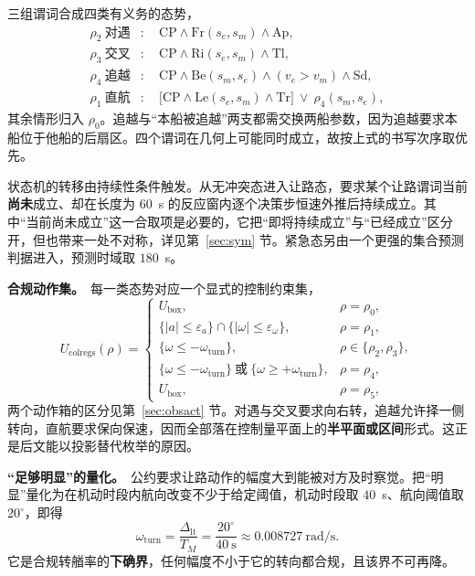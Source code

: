 \documentclass[12pt,letterpaper]{article}
\begin{document}
三组谓词合成四类有义务的态势，
\begin{equation}
\begin{aligned}
\rho_2\ \text{对遇}&:\quad \mathrm{CP}\wedge\mathrm{Fr}(s_e,s_m)\wedge\mathrm{Ap},\\
\rho_3\ \text{交叉}&:\quad \mathrm{CP}\wedge\mathrm{Ri}(s_e,s_m)\wedge\mathrm{Tl},\\
\rho_4\ \text{追越}&:\quad \mathrm{CP}\wedge\mathrm{Be}(s_m,s_e)\wedge(v_e>v_m)\wedge\mathrm{Sd},\\
\rho_1\ \text{直航}&:\quad \bigl[\mathrm{CP}\wedge\mathrm{Le}(s_e,s_m)\wedge\mathrm{Tr}\bigr]\ \vee\ \rho_4(s_m,s_e),
\end{aligned}
\label{eq:situations}
\end{equation}
其余情形归入 $\rho_0$。追越与“本船被追越”两支都需交换两船参数，因为追越要求本船位于他船的后扇区。四个谓词在几何上可能同时成立，故按上式的书写次序取优先。

状态机的转移由持续性条件触发。从无冲突态进入让路态，要求某个让路谓词当前\textbf{尚未}成立、却在长度为 $60$~s 的反应窗内逐个决策步恒速外推后持续成立。其中“当前尚未成立”这一合取项是必要的，它把“即将持续成立”与“已经成立”区分开，但也带来一处不对称，详见第~\ref{sec:sym} 节。紧急态另由一个更强的集合预测判据进入，预测时域取 $180$~s。

\textbf{合规动作集。}\ 每一类态势对应一个显式的控制约束集，
\begin{equation}
 U_{\mathrm{colregs}}(\rho)=
 \begin{cases}
  U_{\mathrm{box}}, & \rho=\rho_0,\\[2pt]
  \{|a|\le\varepsilon_a\}\cap\{|\omega|\le\varepsilon_\omega\}, & \rho=\rho_1,\\[2pt]
  \{\omega\le-\omega_{\mathrm{turn}}\}, & \rho\in\{\rho_2,\rho_3\},\\[2pt]
  \{\omega\le-\omega_{\mathrm{turn}}\}\ \text{或}\ \{\omega\ge+\omega_{\mathrm{turn}}\}, & \rho=\rho_4,\\[2pt]
  U_{\mathrm{box}}, & \rho=\rho_5,
 \end{cases}
 \label{eq:ucolregs}
\end{equation}
两个动作箱的区分见第~\ref{sec:obsact} 节。对遇与交叉要求向右转，追越允许择一侧转向，直航要求保向保速，因而全部落在控制量平面上的\textbf{半平面或区间}形式。这正是后文能以投影替代枚举的原因。

\textbf{“足够明显”的量化。}\ 公约要求让路动作的幅度大到能被对方及时察觉。把“明显”量化为在机动时段内航向改变不少于给定阈值，机动时段取 $40$~s、航向阈值取 $20^\circ$，即得
\begin{equation}
 \omega_{\mathrm{turn}}=\frac{\Delta_{\mathrm{lt}}}{T_M}=\frac{20^\circ}{40~\mathrm{s}}\approx 0.008727~\mathrm{rad/s}.
 \label{eq:omegaturn}
\end{equation}
它是合规转艏率的\textbf{下确界}，任何幅度不小于它的转向都合规，且该界不可再降。
\end{document}
